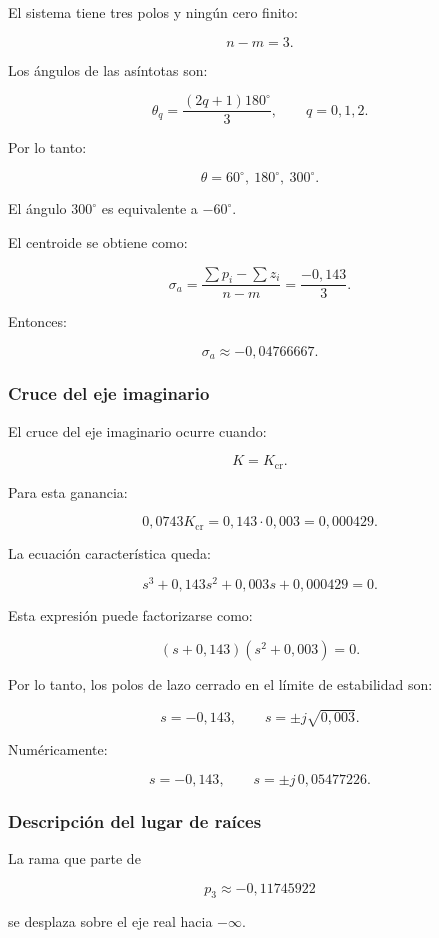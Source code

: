 \documentclass[12pt,a4paper]{article}
\begin{document}
El sistema tiene tres polos y ningún cero finito:

\[
n-m=3.
\]

Los ángulos de las asíntotas son:

\[
\theta_q
=
\frac{(2q+1)180^\circ}{3},
\qquad
q=0,1,2.
\]

Por lo tanto:

\[
\boxed{
\theta=60^\circ,\ 180^\circ,\ 300^\circ.
}
\]

El ángulo $300^\circ$ es equivalente a $-60^\circ$.

El centroide se obtiene como:

\[
\sigma_a
=
\frac{
\sum p_i-\sum z_i
}{
n-m
}
=
\frac{-0{,}143}{3}.
\]

Entonces:

\[
\boxed{
\sigma_a\approx-0{,}04766667.
}
\]


\subsubsection*{Cruce del eje imaginario}

El cruce del eje imaginario ocurre cuando:

\[
K=K_{\mathrm{cr}}.
\]

Para esta ganancia:

\[
0{,}0743K_{\mathrm{cr}}
=
0{,}143\cdot0{,}003
=
0{,}000429.
\]

La ecuación característica queda:

\[
s^3
+
0{,}143s^2
+
0{,}003s
+
0{,}000429
=
0.
\]

Esta expresión puede factorizarse como:

\[
(s+0{,}143)(s^2+0{,}003)=0.
\]

Por lo tanto, los polos de lazo cerrado en el límite
de estabilidad son:

\[
\boxed{
s=-0{,}143,
\qquad
s=\pm j\sqrt{0{,}003}.
}
\]

Numéricamente:

\[
\boxed{
s=-0{,}143,
\qquad
s=\pm j\,0{,}05477226.
}
\]


\subsubsection*{Descripción del lugar de raíces}

La rama que parte de

\[
p_3\approx-0{,}11745922
\]

se desplaza sobre el eje real hacia $-\infty$.
\end{document}
